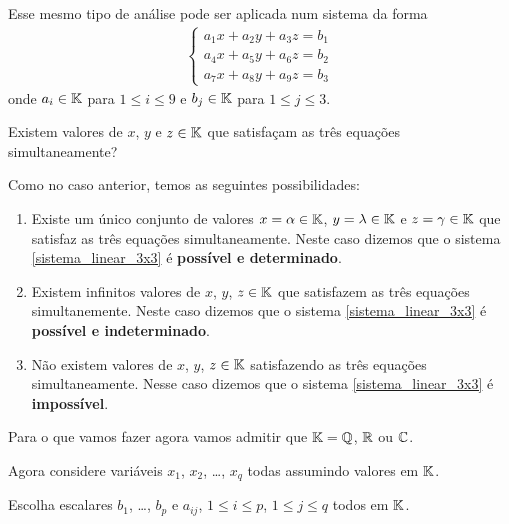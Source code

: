 \documentclass{beamer}
\begin{document}
    \begin{frame}
        Esse mesmo tipo de análise pode ser aplicada num sistema da forma
        \begin{align}
            \begin{cases}\label{sistema_linear_3x3}
                a_1x + a_2y + a_3z = b_1\\
                a_4x + a_5y + a_6z = b_2\\
                a_7x + a_8y + a_9z = b_3
            \end{cases}
        \end{align}
        onde $a_i \in \mathbb{K}$ para $1 \le i \le 9$ e $b_j \in \mathbb{K}$ para $1 \le j \le 3$.\pause

        \vspace{.3cm}

        Existem valores de $x$, $y$ e $z \in \mathbb{K}$ que satisfaçam as três equações simultaneamente?
    \end{frame}
    
    \begin{frame}
        Como no caso anterior, temos as seguintes possibilidades:\pause
        \begin{enumerate}[label={\roman*})]
            \item Existe um único conjunto de valores $x = \alpha \in \mathbb{K}$, $y = \lambda \in \mathbb{K}$ e $z = \gamma \in \mathbb{K}$ \pause que satisfaz as três equações simultaneamente. \pause Neste caso dizemos que o sistema \eqref{sistema_linear_3x3} \pause é \textbf{possível e determinado}.\pause

            \item Existem infinitos valores de $x$, $y$, $z \in \mathbb{K}$ \pause que satisfazem as três equações simultanemente. \pause Neste caso dizemos que o sistema \eqref{sistema_linear_3x3} \pause é \textbf{possível e indeterminado}.\pause

            \item Não existem valores de $x$, $y$, $z \in \mathbb{K}$ \pause satisfazendo as três equações simultaneamente. \pause Nesse caso dizemos que o sistema \eqref{sistema_linear_3x3} \pause é \textbf{impossível}.
        \end{enumerate}
    \end{frame}

    \begin{frame}

        Para o que vamos fazer agora vamos admitir que $\mathbb{K} = \mathbb{Q}$, \pause $\mathbb{R}$ \pause ou $\mathbb{C}$.\pause

        \vspace{.3cm}

        Agora considere variáveis $x_1$, $x_2$, \dots, $x_q$ \pause todas assumindo valores em $\mathbb{K}$.\pause

        \vspace{.3cm}

        Escolha escalares $b_1$, \dots, $b_p$ \pause e $a_{ij}$, \pause $1 \le i \le p$, $1 \le j \le q$ todos em $\mathbb{K}$.
    \end{frame}
    
\end{document}
